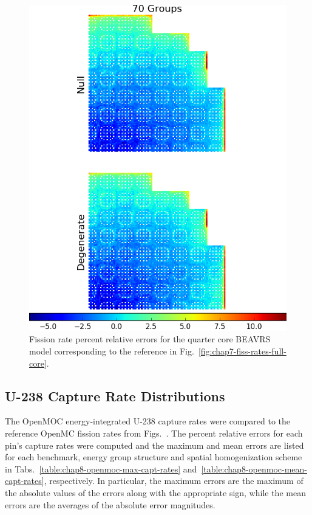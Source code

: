 \begin{figure}[h!]
\centering
\includegraphics[width=\linewidth]{figures/quantification/full-core/fiss-err}
\vspace{2mm}
\caption[Fission rate errors for the 2D quarter core \ac{BEAVRS} model]{Fission rate percent relative errors for the quarter core \ac{BEAVRS} model corresponding to the reference in Fig.~\ref{fig:chap7-fiss-rates-full-core}.}
\label{fig:chap8-full-core-fiss-err}
\end{figure}

\clearpage


\subsection{U-238 Capture Rate Distributions}
\label{subsec:chap8-capt-rates}

The OpenMOC energy-integrated U-238 capture rates were compared to the reference OpenMC fission rates from Figs.~. The percent relative errors for each pin's capture rates were computed and the maximum and mean errors are listed for each benchmark, energy group structure and spatial homogenization scheme in Tabs.~\ref{table:chap8-openmoc-max-capt-rates} and~\ref{table:chap8-openmoc-mean-capt-rates}, respectively. In particular, the maximum errors are the maximum of the absolute values of the errors along with the appropriate sign, while the mean errors are the averages of the absolute error magnitudes.

